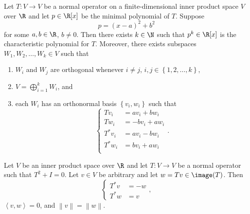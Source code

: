\documentclass[linearalgebra]{subfiles}
\begin{document}
    \begin{prop}{}
        Let $T:V\to V$ be a normal operator on a finite-dimensional inner product space $V$ over $\R$ and let $p\in\R[x]$ be the minimal polynomial of $T$. Suppose
        \begin{equation*}
            p = (x-a)^2 + b^2
        \end{equation*}
        for some $a,b\in\R$, $b\neq 0$. Then there exists $k\in\N$ such that $p^k\in\R[x]$ is the characteristic polynomial for $T$. Moreover, there exists subspaces $W_1,W_2,\ldots,W_k\in V$ such that
        \begin{enumerate}
            \item $W_i$ and $W_j$ are orthogonal whenever $i\neq j$, $i,j\in\left\lbrace 1,2,\ldots,k \right\rbrace$,
            \item $V=\bigoplus^{k}_{i=1} W_i$, and
            \item each $W_i$ has an orthonormal basis $\left\lbrace v_i,w_i \right\rbrace$ such that
                \begin{equation*}
                    \begin{cases} 
                        Tv_i & = av_i + bw_i \\
                        Tw_i & = -bv_i + aw_i \\
                        T^{*} v_i & = av_i - bw_i \\
                        T^{*} w_i & = bv_i + aw_i \\
                    \end{cases}.
                \end{equation*}
        \end{enumerate}
    \end{prop}

    \begin{lemma_inside}{}
        Let $V$ be an inner product space over $\R$ and let $T:V\to V$ be a normal operator such that $T^2+I = 0$. Let $v\in V$ be arbitrary and let $w=Tv\in\image(T)$. Then
        \begin{equation*}
            \begin{cases} 
                T^{*} v & = -w \\
                T^{*} w & = v
            \end{cases},
        \end{equation*}
        $\left\langle v, w\right\rangle = 0$, and $\left\lVert v\right\rVert = \left\lVert w\right\rVert$.
    \end{lemma_inside}
\end{document}
